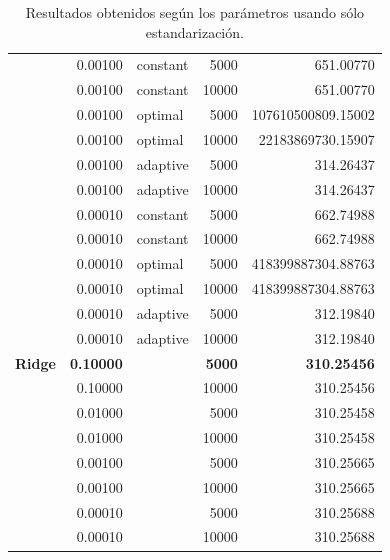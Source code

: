 \documentclass[a4paper, 20pt]{article}
\begin{document}
\begin{table}[H]
\begin{tabular}{lrlrr}
                                 & 0.00100   & constant & 5000        & 651.00770          \\
                                 & 0.00100   & constant & 10000       & 651.00770          \\
                                 & 0.00100   & optimal  & 5000        & 107610500809.15002 \\
                                 & 0.00100   & optimal  & 10000       & 22183869730.15907  \\
                                 & 0.00100   & adaptive & 5000        & 314.26437          \\
                                 & 0.00100   & adaptive & 10000       & 314.26437          \\
                                 & 0.00010   & constant & 5000        & 662.74988          \\
                                 & 0.00010   & constant & 10000       & 662.74988          \\
                                 & 0.00010   & optimal  & 5000        & 418399887304.88763 \\
                                 & 0.00010   & optimal  & 10000       & 418399887304.88763 \\
                                 & 0.00010   & adaptive & 5000        & 312.19840          \\
                                 & 0.00010   & adaptive & 10000       & 312.19840          \\
\textbf{Ridge}                            & \textbf{0.10000}   &          & \textbf{5000}        & \textbf{310.25456}          \\
                                 & 0.10000   &          & 10000       & 310.25456          \\
                                 & 0.01000   &          & 5000        & 310.25458          \\
                                 & 0.01000   &          & 10000       & 310.25458          \\
                                 & 0.00100   &          & 5000        & 310.25665          \\
                                 & 0.00100   &          & 10000       & 310.25665          \\
                                 & 0.00010   &          & 5000        & 310.25688          \\
                                 & 0.00010   &          & 10000       & 310.25688         
\end{tabular}
\caption{Resultados obtenidos según los parámetros usando sólo estandarización.}
\end{table}
\end{document}
